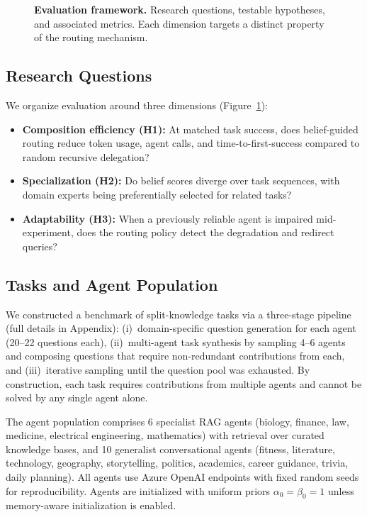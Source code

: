\begin{figure}[t]
{%
}
\caption{\textbf{Evaluation framework.} Research questions, testable hypotheses, and associated metrics. Each dimension targets a distinct property of the routing mechanism.}
\label{fig:rq-flow}
\end{figure}

\subsection{Research Questions}
We organize evaluation around three dimensions (Figure~\ref{fig:rq-flow}):
\begin{itemize}[leftmargin=1.4em]
    \item[\textbf{RQ1}] \textbf{Composition efficiency (H1):} At matched task success, does belief-guided routing reduce token usage, agent calls, and time-to-first-success compared to random recursive delegation?
    \item[\textbf{RQ2}] \textbf{Specialization (H2):} Do belief scores diverge over task sequences, with domain experts being preferentially selected for related tasks?
    \item[\textbf{RQ3}] \textbf{Adaptability (H3):} When a previously reliable agent is impaired mid-experiment, does the routing policy detect the degradation and redirect queries?
\end{itemize}

\subsection{Tasks and Agent Population}
We constructed a benchmark of split-knowledge tasks via a three-stage pipeline (full details in Appendix): (i)~domain-specific question generation for each agent (20--22 questions each), (ii)~multi-agent task synthesis by sampling 4--6 agents and composing questions that require non-redundant contributions from each, and (iii)~iterative sampling until the question pool was exhausted. By construction, each task requires contributions from multiple agents and cannot be solved by any single agent alone.

The agent population comprises 6 specialist RAG agents (biology, finance, law, medicine, electrical engineering, mathematics) with retrieval over curated knowledge bases, and 10 generalist conversational agents (fitness, literature, technology, geography, storytelling, politics, academics, career guidance, trivia, daily planning). All agents use Azure OpenAI endpoints with fixed random seeds for reproducibility. Agents are initialized with uniform priors $\alpha_0=\beta_0=1$ unless memory-aware initialization is enabled.

